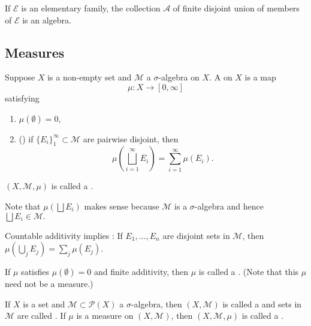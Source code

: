 \documentclass[12pt]{article}	%
\begin{document}
\begin{prop} \label{prop:elementary-family-gives-algebra}
	If $\mathcal{E}$ is an elementary family, the collection $\mathcal{A}$ of finite disjoint union of members of $\mathcal{E}$ is an algebra.
\end{prop}

\subsection{Measures}

\begin{defn}[Measure]
	Suppose $X$ is a non-empty set and $\mathcal{M}$ a $\sigma$-algebra on $X.$ A  on $X$ is a map 
	\begin{equation*} 
		\mu : X \to [0, \infty]
	\end{equation*}
	satisfying
	\begin{enumerate}
		\item $\mu(\emptyset) = 0,$
		\item () if $\{E_i\}_{1}^\infty \subset \mathcal{M}$ are pairwise disjoint, then
		\begin{equation*} 
			\mu\left(\bigsqcup_{i = 1}^\infty E_i\right) = \sum_{i = 1}^{\infty} \mu(E_i).
		\end{equation*}
	\end{enumerate}
	$(X, \mathcal{M}, \mu)$ is called a .
\end{defn}
Note that $\mu\left(\bigsqcup E_i\right)$ makes sense because $\mathcal{M}$ is a $\sigma$-algebra and hence $\bigsqcup E_i \in \mathcal{M}.$

\begin{rem}
	Countable additivity implies : If $E_{1}, \ldots, E_{n}$ are disjoint sets in $\mathcal{M}$, then $\mu\left(\bigcup_{j} E_{j}\right) = \sum_{j} \mu(E_{j})$. 

	If $\mu$ satisfies $\mu(\emptyset) = 0$ and finite additivity, then $\mu$ is called a . (Note that this $\mu$ need not be a measure.)
\end{rem}

\begin{defn}
	If $X$ is a set and $\mathcal{M} \subset \mathcal{P}(X)$ a $\sigma$-algebra, then $(X, \mathcal{M})$ is called a  and sets in $\mathcal{M}$ are called . If $\mu$ is a measure on $(X, \mathcal{M})$, then $(X, \mathcal{M}, \mu)$ is called a .
\end{defn}
\end{document}
